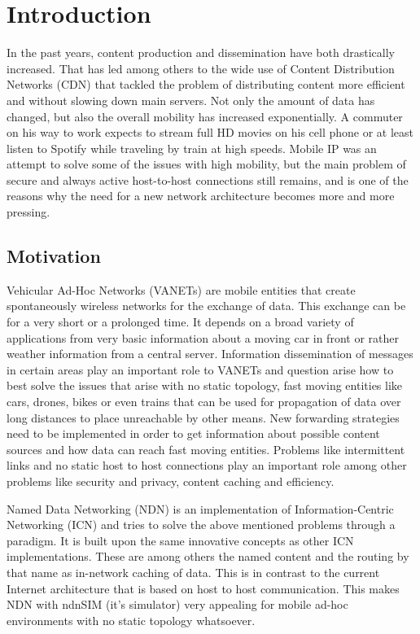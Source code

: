 \chapter{Introduction}

In the past years, content production and dissemination have both drastically increased. That has led among others to the wide use of Content Distribution Networks (CDN) that tackled the problem of distributing content more efficient and without slowing down main servers. Not only the amount of data has changed, but also the overall mobility has increased exponentially. A commuter on his way to work expects to stream full HD movies on his cell phone or at least listen to Spotify while traveling by train at high speeds. Mobile IP was an attempt to solve some of the issues with high mobility, but the main problem of secure and always active host-to-host connections still remains, and is one of the reasons why the need for a new network architecture becomes more and more pressing.

\section{Motivation}

Vehicular Ad-Hoc Networks (VANETs) are mobile entities that create spontaneously wireless networks for the exchange of data. This exchange can be for a very short or a prolonged time. It depends on a broad variety of applications from very basic information about a moving car in front or rather weather information from a central server. Information dissemination of messages in certain areas play an important role to VANETs and question arise how to best solve the issues that arise with no static topology, fast moving entities like cars, drones, bikes or even trains that can be used for propagation of data over long distances to place unreachable by other means. New forwarding strategies need to be implemented in order to get information about possible content sources and how data can reach fast moving entities. Problems like intermittent links and no static host to host connections play an important role among other problems like security and privacy, content caching and efficiency.

Named Data Networking (NDN) is an implementation of Information-Centric Networking (ICN) and tries to solve the above mentioned problems through a paradigm. It is built upon the same innovative concepts as other ICN implementations. These are among others the named content and the routing by that name as in-network caching of data. This is in contrast to the current Internet architecture that is based on host to host communication. This makes NDN with ndnSIM (it's simulator) very appealing for mobile ad-hoc environments with no static topology whatsoever.

